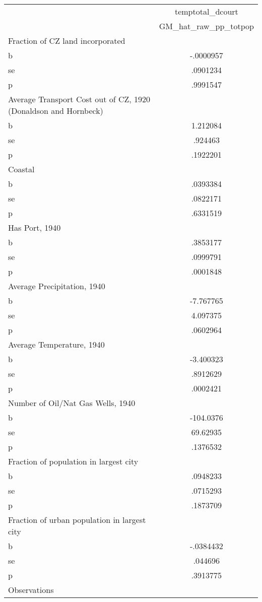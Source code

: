\begin{tabular}{l*{1}{c}}
\toprule
                &temptotal\_dcourt\\
                &GM\_hat\_raw\_pp\_totpop\\
\midrule
Fraction of CZ land incorporated&         \\
b               &-.0000957\\
se              & .0901234\\
p               & .9991547\\
\midrule
Average Transport Cost out of CZ, 1920 (Donaldson and Hornbeck)&         \\
b               & 1.212084\\
se              &  .924463\\
p               & .1922201\\
\midrule
Coastal         &         \\
b               & .0393384\\
se              & .0822171\\
p               & .6331519\\
\midrule
Has Port, 1940  &         \\
b               & .3853177\\
se              & .0999791\\
p               & .0001848\\
\midrule
Average Precipitation, 1940&         \\
b               &-7.767765\\
se              & 4.097375\\
p               & .0602964\\
\midrule
Average Temperature, 1940&         \\
b               &-3.400323\\
se              & .8912629\\
p               & .0002421\\
\midrule
Number of Oil/Nat Gas Wells, 1940&         \\
b               &-104.0376\\
se              & 69.62935\\
p               & .1376532\\
\midrule
Fraction of population in largest city&         \\
b               & .0948233\\
se              & .0715293\\
p               & .1873709\\
\midrule
Fraction of urban population in largest city&         \\
b               &-.0384432\\
se              &  .044696\\
p               & .3913775\\
\midrule
Observations    &         \\
\bottomrule
\end{tabular}
